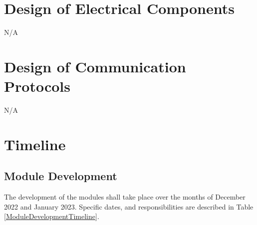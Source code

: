 \documentclass[12pt, titlepage]{article}
\begin{document}
\section{Design of Electrical Components}
N/A

\section{Design of Communication Protocols}
N/A

\section{Timeline}

\subsection{Module Development}

The development of the modules shall take place over the months of December 2022 and January 2023.
Specific dates, and responsibilities are described in Table \ref{ModuleDevelopmentTimeline}.
\end{document}

